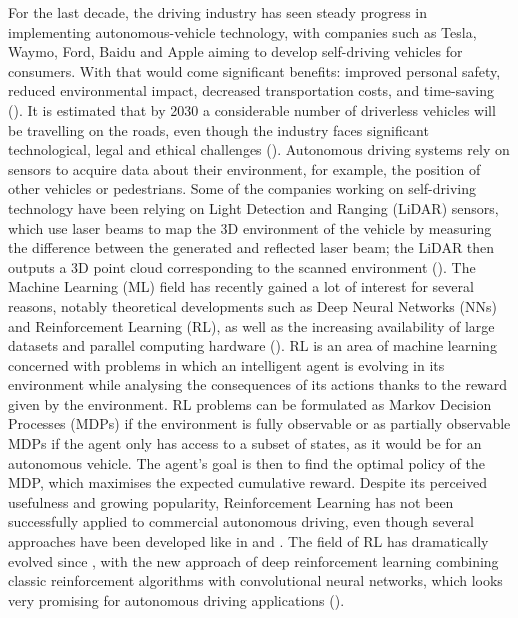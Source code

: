 For the last decade, the driving industry has seen steady progress in implementing autonomous-vehicle technology, with companies such as Tesla, Waymo, Ford, Baidu and Apple aiming to develop self-driving vehicles for consumers. With that would come significant benefits: improved personal safety, reduced environmental impact, decreased transportation costs, and time-saving (\cite{Barab_s_2017}). It is estimated that by 2030 a considerable number of driverless vehicles will be travelling on the roads, even though the industry faces significant technological, legal and ethical challenges (\cite{Barab_s_2017}). Autonomous driving systems rely on sensors to acquire data about their environment, for example, the position of other vehicles or pedestrians. Some of the companies working on self-driving technology have been relying on Light Detection and Ranging (LiDAR) sensors, which use laser beams to map the 3D environment of the vehicle by measuring the difference between the generated and reflected laser beam; the LiDAR then outputs a 3D point cloud corresponding to the scanned environment (\cite{lidar}).
	\newline
The Machine Learning (ML) field has recently gained a lot of interest for several reasons, notably theoretical developments such as Deep Neural Networks (NNs) and Reinforcement Learning (RL), as well as the increasing availability of large datasets and parallel computing hardware (\cite{smart}). RL is an area of machine learning concerned with problems in which an intelligent agent is evolving in its environment while analysing the consequences of its actions thanks to the reward given by the environment. RL problems can be formulated as Markov Decision Processes (MDPs) if the environment is fully observable or as partially observable MDPs if the agent only has access to a subset of states, as it would be for an autonomous vehicle. The agent's goal is then to find the optimal policy of the MDP, which maximises the expected cumulative reward. Despite its perceived usefulness and growing popularity, Reinforcement Learning has not been successfully applied to commercial autonomous driving, even though several approaches have been developed like in \cite{Reference2} and \cite{Reference3}. The field of RL has dramatically evolved since \cite{watkins1989}, with the new approach of deep reinforcement learning combining classic reinforcement algorithms with convolutional neural networks, which looks very promising for autonomous driving applications (\cite{Reference4}).
	\newline
